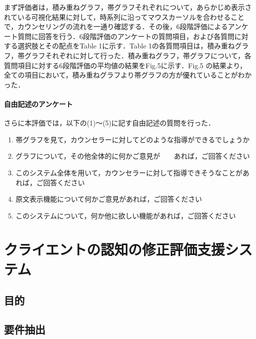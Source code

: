 \documentclass[shuuron]{kuee}
\begin{document}
まず評価者は，積み重ねグラフ，帯グラフそれぞれについて，あらかじめ表示されている可視化結果に対して，時系列に沿ってマウスカーソルを合わせることで，カウンセリングの流れを一通り確認する．その後，6段階評価によるアンケート質問に回答を行う．6段階評価のアンケートの質問項目，および各質問に対する選択肢とその配点をTable 1に示す．Table 1の各質問項目は，積み重ねグラフ，帯グラフそれぞれに対して行った．積み重ねグラフ，帯グラフについて，各質問項目に対する6段階評価の平均値の結果をFig.5に示す．Fig.5 の結果より，全ての項目において，積み重ねグラフより帯グラフの方が優れていることがわかった．

\subsubsection{自由記述のアンケート}


さらに本評価では，以下の(1)～(5)に記す自由記述の質問を行った．



\begin{enumerate}
 \item 帯グラフを見て，カウンセラーに対してどのような指導ができるでしょうか
 \item グラフについて，その他全体的に何かご意見が　　あれば，ご回答ください
 \item このシステム全体を用いて，カウンセラーに対して指導できそうなことがあれば，ご回答ください
 \item 原文表示機能について何かご意見があれば，ご回答ください
 \item このシステムについて，何か他に欲しい機能があれば，ご回答ください
\end{enumerate}









\chapter{クライエントの認知の修正評価支援システム}
	\section{目的}


\section{要件抽出}
\end{document}
